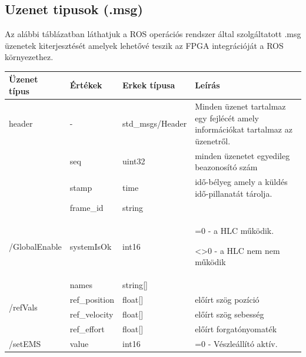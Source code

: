 \subsection{Uzenet tipusok (.msg)}
Az alábbi táblázatban láthatjuk a ROS operációs rendszer által szolgáltatott .msg üzenetek kiterjesztését amelyek lehetővé teszik az FPGA integrációját a ROS környezethez.
\begin{table}[H]
\centering
\begin{tabular}{lllp{6cm}}
\hline \textbf{Üzenet típus}              & \textbf{Értékek}   & \textbf{Erkek típusa} & \textbf{Leírás} \\ \hline
 header                   &     -     &      std\_msgs/Header      &   Minden üzenet tartalmaz egy fejlécét amely információkat tartalmaz az üzenetről. \\   
                          & seq       &      uint32        &   minden üzenetet egyedileg beazonosító szám     \\
                          & stamp     &      time        &  idő-bélyeg amely a küldés idő-pillanatát tárolja.      \\
                          & frame\_id  &      string        &        \\  \hline
                          
\hline  \multirow{1}{*}{/GlobalEnable}  &   systemIsOk        &    int16          &    
                                                                          =0 - a HLC működik.
                                                                          
                                                                          <>0 -  a HLC nem nem működik      \\    \hline                    
\hline\multirow{4}{*}{/refVals} & names     & string{[}{]} &        \\
                          & ref\_position  & float{[}{]}  & előírt szög pozíció       \\
                          & ref\_velocity & float{[}{]}  &  előírt szög sebesség      \\ 
                          & ref\_effort &    float{[}{]}  &  előírt forgatónyomaték    \\\hline
 \hline \multirow{1}{*}{/setEMS}  &   value        &     int16         &      =0 - Vészleállító aktív.
                                                                          

\end{tabular}
\end{table}
